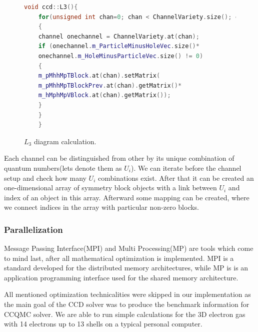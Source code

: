 \documentclass[twoside,english]{uiofysmaster}
\begin{document}
\begin{figure}
	\begin{lstlisting}[language=C++]
	void ccd::L3(){
	for(unsigned int chan=0; chan < ChannelVariety.size(); chan++)
	{
	channel onechannel = ChannelVariety.at(chan);
	if (onechannel.m_ParticleMinusHoleVec.size()*
	onechannel.m_HoleMinusParticleVec.size() != 0)
	{
	m_pMhhMpTBlock.at(chan).setMatrix(
	m_pMhhMpTBlockPrev.at(chan).getMatrix()*
	m_hMphMpVBlock.at(chan).getMatrix());
	}
	}
	}
	\end{lstlisting}
	\caption{$L_3$ diagram calculation.}\label{fig:L3}
\end{figure}

Each channel can be distinguished from other by its unique combination of quantum numbers(lets denote them as $U_i$). We can iterate before the channel setup and check how many $U_i$ combinations exist. After that it can be created an one-dimensional array of symmetry block objects with a link between $U_i$ and index of an object in this array. Afterward some mapping can be created, where we connect indices in the array with particular non-zero blocks.

\subsubsection{Parallelization}

Message Passing Interface(MPI) and Multi Processing(MP) are tools which come to mind last, after all mathematical optimization is implemented. MPI is a standard developed for the distributed memory architectures, while MP is is an application programming interface used for the shared memory architecture.



All mentioned optimization technicalities were skipped in our implementation as the main goal of the CCD solver was to produce the benchmark information for CCQMC solver. We are able to run simple calculations for the 3D electron gas with 14 electrons up to 13 shells on a typical personal computer.
\end{document}
